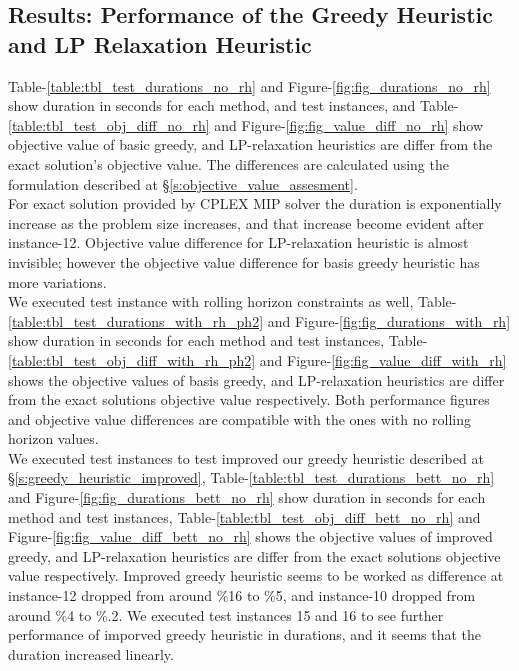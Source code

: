 \documentclass[11pt]{article}
\begin{document}
\subsection{Results: Performance of the Greedy Heuristic and LP Relaxation Heuristic} \label{s:test_evaluation}
Table-\ref{table:tbl_test_durations_no_rh} and Figure-\ref{fig:fig_durations_no_rh} show duration in seconds for each method, and test instances, and Table-\ref{table:tbl_test_obj_diff_no_rh} and Figure-\ref{fig:fig_value_diff_no_rh} show  objective value of basic greedy, and LP-relaxation heuristics are differ from the exact solution's objective value. The differences are calculated using the formulation described at \S \ref{s:objective_value_assesment}.\\

For exact solution provided by CPLEX MIP solver the duration is exponentially increase as the problem size increases, and that increase become evident after instance-12. Objective value difference for LP-relaxation heuristic is almost invisible; however the objective value difference for basis greedy heuristic has more variations.\\

We executed test instance with rolling horizon constraints as well, Table-\ref{table:tbl_test_durations_with_rh_ph2} and Figure-\ref{fig:fig_durations_with_rh} show duration in seconds for each method and test instances, Table-\ref{table:tbl_test_obj_diff_with_rh_ph2} and Figure-\ref{fig:fig_value_diff_with_rh} shows the objective values of basis greedy, and LP-relaxation heuristics are differ from the exact solutions objective value respectively. Both performance figures and objective value differences are compatible with the ones with no rolling horizon values.\\

We executed test instances to test improved our greedy heuristic described at \S \ref{s:greedy_heuristic_improved}, Table-\ref{table:tbl_test_durations_bett_no_rh} and Figure-\ref{fig:fig_durations_bett_no_rh} show duration in seconds for each method and test instances, Table-\ref{table:tbl_test_obj_diff_bett_no_rh} and Figure-\ref{fig:fig_value_diff_bett_no_rh} shows the objective values of improved greedy, and LP-relaxation heuristics are differ from the exact solutions objective value respectively. Improved greedy heuristic seems to be worked as difference at instance-12 dropped from around \%16 to \%5, and instance-10 dropped from around \%4 to \%.2. We executed test instances 15 and 16 to see further performance of imporved greedy heuristic in durations, and it seems that the duration increased linearly.\\
\end{document}
